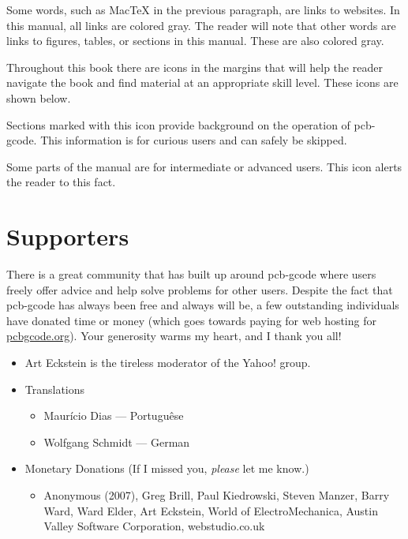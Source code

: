 \documentclass[11pt]{book}
\begin{document}
\noindent Some words, such as MacTeX in the previous paragraph, are links to websites. In this manual, all links are colored gray. The reader will note that other words are links to figures, tables, or sections in this manual. These are also colored gray.
\vspace{1ex}

\noindent Throughout this book there are icons in the margins that will help the reader navigate the book and find material at an appropriate skill level. These icons are shown below.
\vspace{1ex}

\howitworks{} \noindent Sections marked with this icon provide background on the operation of pcb-gcode. This information is for curious users and can safely be skipped.
\vspace{7ex}


\warning{} \noindent Some parts of the manual are for intermediate or advanced users. This icon alerts the reader to this fact.

\vspace{2ex}

\section*{Supporters}

\noindent There is a great community that has built up around pcb-gcode where users freely offer advice and help solve problems for other users. Despite the fact that pcb-gcode has always been free and always will be, a few outstanding individuals have donated time or money (which goes towards paying for web hosting for \url{pcbgcode.org}). Your generosity warms my heart, and I thank you all!

\begin{itemize}
	\item Art Eckstein is the tireless moderator of the Yahoo! group.
	\item Translations
	\begin{itemize}
		\item Maur\'icio Dias --- Portugu\^ese
		\item Wolfgang Schmidt --- German
	\end{itemize}
	\item{Monetary Donations (If I missed you, \emph{please} let me know.) }
	\begin{itemize}
	    \small
		\item Anonymous (2007), Greg Brill, Paul Kiedrowski, Steven Manzer, Barry Ward, Ward Elder, Art Eckstein, World of ElectroMechanica, Austin Valley Software Corporation, webstudio.co.uk
	\end{itemize}
\end{itemize}
\end{document}

